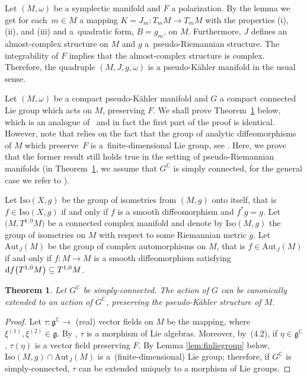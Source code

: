 \documentclass[10pt,a4paper]{amsart}
\numberwithin{equation}{section}
\newtheorem{Theorem}{Theorem}[section]
\begin{document}
 	Let $(M, \omega)$ be a symplectic manifold and $F$ a polarization. By the lemma we get for each~${m\in M}$ a mapping $K=J_m \colon T_mM\rightarrow T_mM$ with the properties (i), (ii), and (iii) and a~quadratic form, $B=g_m$, on $M$. Furthermore, $J$ defines an almost-complex structure on $M$ and $g$ a~pseudo-Riemannian structure. The integrability of $F$ implies that the almost-complex structure is complex. Therefore, the quadruple $(M,J,g, \omega)$ is a pseudo-K\"ahler manifold in the usual sense.
 	
 	Let $(M,\omega)$ be a compact pseudo-K\"ahler manifold and $G$ a compact connected Lie group which acts on $M$, preserving $F$. We shall prove Theorem~\ref{thm:4.4} below, which is an analogue of~\cite[Theorem~4.4]{gs} and in fact the first part of the proof is identical. However, note that \cite[Theorem~4.4]{gs} relies on the fact that the group of analytic diffeomorphisms of $M$ which preserve~$F$ is a~finite-dimensional Lie group, see \cite{k}. Here, we prove that the former result still holds true in the setting of pseudo-Riemannian manifolds (in Theorem~\ref{thm:4.4}, we assume that $G^{\mathbb{C}}$ is simply connected, for the general case we refer to \cite[Theorem~4.4]{gs}).
 	
 	Let $\mathrm{Iso}(X, g)$ be the group of isometries from $(M, g)$ onto itself, that is $f \in \mathrm{Iso}(X, g)$ if and only if $f$ is a smooth diffeomorphism and $f^*g=g$. Let $\bigl(M, T^{1,0}M\bigr)$ be a connected complex manifold and denote by $\mathrm{Iso}(M, g)$ the group of isometries on $M$ with respect to some Riemannian metric $g$. Let $\mathrm{Aut}_J(M)$ be the group of complex automorphisms on $M$, that is $f\in\mathrm{Aut}_J(M)$ if and only if $f \colon M\rightarrow M$ is a smooth diffeomorphism satisfying ${\rm d}f\bigl(T^{1,0}M\bigr) \subseteq T^{1,0}M$.
 	
 	\begin{Theorem} \label{thm:4.4} Let $G^{\mathbb{C}}$ be simply-connected. The action of $G$ can be canonically extended to an action of $G^{\mathbb{C}}$, preserving the pseudo-K\"ahler structure of $M$.
 	\end{Theorem}
 	\begin{proof}
 		Let
$\tau \colon \mathfrak{g}^{\mathbb{C}} \rightarrow $ (real) vector fields on $M$
 		be the mapping, 
 		where $\xi^{(1)}, \xi^{(2)}\in \mathfrak{g}$. By \cite[equations~(4.2) and (4.3)]{gs}, $\tau$ is a morphism of Lie algebras. Moreover, by~(4.2), if $\eta \in \mathfrak{g}^{\mathbb{C}}$, $\tau(\eta)$ is a vector field preserving $F$. By Lemma \ref{lem:finliegroup} below, $\mathrm{Iso}(M, g)\cap \mathrm{Aut}_J(M)$ is a~(finite-dimensional) Lie group; therefore, if $G^{\mathbb{C}}$ is simply-connected, $\tau$ can be extended uniquely to a morphism of Lie groups.
 	\end{proof}
\end{document}

